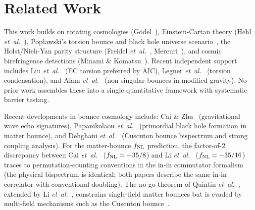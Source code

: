 \documentclass[aps,prd,twocolumn,superscriptaddress,showpacs,preprintnumbers,nofootinbib,longbibliography,floatfix]{revtex4-2}
\newcommand{\etal}{\textit{et~al.}}
\newcommand{\fnl}{f_{\rm NL}}
\begin{document}
\section{Related Work}\label{sec:related}
This work builds on rotating cosmologies (G\"odel~\cite{Godel1949}), Einstein-Cartan theory (Hehl \etal~\cite{Hehl1976}), Pop\l{}awski's torsion bounce and black hole universe scenario~\cite{Poplawski2012,Poplawski2016,Poplawski2010}, the Holst/Nieh-Yan parity structure (Freidel \etal~\cite{Freidel2005}, Mercuri~\cite{Mercuri2006,Mercuri2009}), and cosmic birefringence detections (Minami \& Komatsu~\cite{Minami2020}). Recent independent support includes Liu \etal~\cite{Liu2025} (EC torsion preferred by AIC), Legner \etal~\cite{Legner2025} (torsion condensation), and Alam \etal~\cite{Alam2025bounce} (non-singular bounces in modified gravity). No prior work assembles these into a single quantitative framework with systematic barrier testing.

Recent developments in bounce cosmology include: Cai \& Zhu~\cite{Cai:2026echoes} (gravitational wave echo signatures), Papanikolaou \etal~\cite{Papanikolaou:2024pbh} (primordial black hole formation in matter bounce), and Dehghani \etal~\cite{Dehghani:2025cusc} (Cuscuton bounce bispectrum and strong coupling analysis). For the matter-bounce $\fnl$ prediction, the factor-of-2 discrepancy between Cai \etal~\cite{Cai:2009fn} ($\fnl = -35/8$) and Li \etal~\cite{Li:2016xjb} ($\fnl = -35/16$) traces to permutation-counting conventions in the in-in commutator formalism (the physical bispectrum is identical; both papers describe the same in-in correlator with conventional doubling). The no-go theorem of Quintin \etal~\cite{Quintin:2015rta}, extended by Li \etal~\cite{Li:2016xjb}, constrains single-field matter bounces but is evaded by multi-field mechanisms such as the Cuscuton bounce~\cite{Dehghani:2025cusc}.



\end{document}
